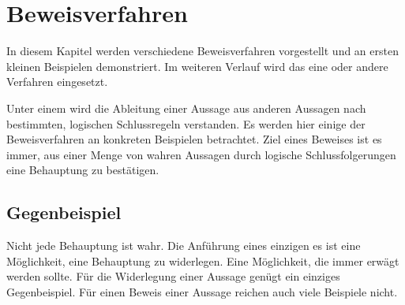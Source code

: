 
\chapter{Beweisverfahren}
\label{cha:Gdl-K03-Beweise}

In diesem Kapitel werden verschiedene Beweisverfahren vorgestellt und an 
ersten kleinen Beispielen demonstriert. Im weiteren Verlauf wird das eine oder
andere Verfahren eingesetzt. 

Unter einem  wird die Ableitung einer Aussage aus anderen 
Aussagen nach bestimmten, logischen Schlussregeln verstanden. Es werden hier 
einige der Beweisverfahren an konkreten Beispielen betrachtet. Ziel eines 
Beweises ist es immer, aus einer Menge von wahren Aussagen durch logische
Schlussfolgerungen eine Behauptung zu bestätigen. 


\section{Gegenbeispiel}
\label{sec:Beweis - Beweisverfahren}

\begin{Unit}[Gegenbeispiel]
Nicht jede Behauptung ist wahr. Die Anführung eines einzigen 
es ist eine Möglichkeit, eine Behauptung zu widerlegen. 
Eine Möglichkeit, die immer erwägt werden sollte. Für die 
Widerlegung einer Aussage genügt ein einziges Gegenbeispiel. Für einen Beweis 
einer Aussage reichen auch viele Beispiele nicht. 
\end{Unit}


